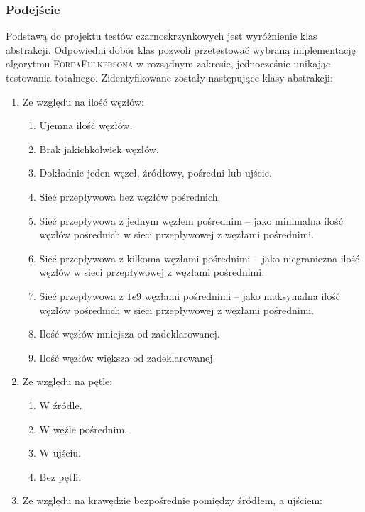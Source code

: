 \subsubsection{Podejście}
Podstawą do projektu testów czarno\dywiz skrzynkowych jest wyróżnienie klas
abstrakcji. Odpowiedni dobór klas pozwoli przetestować wybraną implementację
algorytmu \textsc{Forda\dywiz Fulkersona} w rozsądnym zakresie, jednocześnie
unikając testowania totalnego. Zidentyfikowane zostały następujące klasy
abstrakcji:
\begin{enumerate}
    \item Ze względu na ilość węzłów:
        \begin{enumerate}
            \item Ujemna ilość węzłów.
            \item Brak jakichkolwiek węzłów.
            \item Dokładnie jeden węzeł, źródłowy, pośredni lub ujście.
            \item Sieć przepływowa bez węzłów pośrednich.
            \item Sieć przepływowa z jednym węzłem pośrednim -- jako minimalna
                ilość węzłów pośrednich w sieci przepływowej z węzłami
                pośrednimi.
            \item Sieć przepływowa z kilkoma węzłami pośrednimi -- jako
                niegraniczna ilość węzłów w sieci przepływowej z węzłami
                pośrednimi.
            \item Sieć przepływowa z $1e9$ węzłami pośrednimi -- jako maksymalna
                ilość węzłów pośrednich w sieci przepływowej z węzłami
                pośrednimi.
            \item Ilość węzłów mniejsza od zadeklarowanej.
            \item Ilość węzłów większa od zadeklarowanej.
        \end{enumerate}
    \item Ze względu na pętle:
        \begin{enumerate}
            \item W źródle.
            \item W węźle pośrednim.
            \item W ujściu.
            \item Bez pętli.
        \end{enumerate}
    \item Ze względu na krawędzie bezpośrednie pomiędzy źródłem, a ujściem:
        \begin{enumerate}

\end{enumerate}
\end{enumerate}
